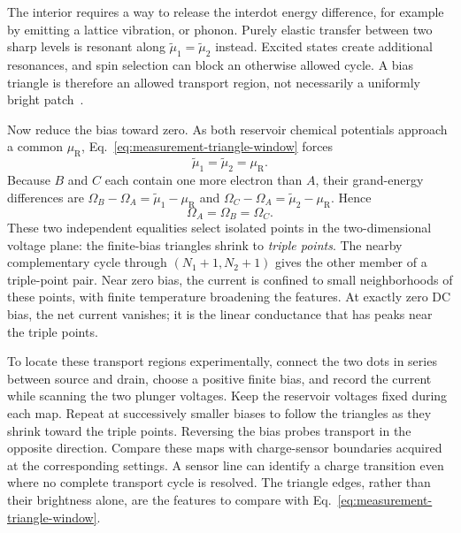 The interior requires a way to release the interdot energy
difference, for example by emitting a lattice vibration, or phonon.
Purely elastic transfer between two sharp levels is resonant along
$\widetilde\mu_1=\widetilde\mu_2$ instead. Excited states create
additional resonances, and spin selection can block an otherwise
allowed cycle. A bias triangle is therefore an allowed transport
region, not necessarily a uniformly bright patch~\cite{VanDerWiel2003}.

Now reduce the bias toward zero. As both reservoir chemical
potentials approach a common $\mu_{\mathrm R}$,
Eq.~\eqref{eq:measurement-triangle-window} forces
\[
 \widetilde\mu_1=\widetilde\mu_2=\mu_{\mathrm R}.
\]
Because $B$ and $C$ each contain one more electron than $A$,
their grand-energy differences are
$\Omega_B-\Omega_A=\widetilde\mu_1-\mu_{\mathrm R}$ and
$\Omega_C-\Omega_A=\widetilde\mu_2-\mu_{\mathrm R}$. Hence
\begin{equation}
 \Omega_A=\Omega_B=\Omega_C.
 \label{eq:measurement-triple-point}
\end{equation}
These two independent equalities select isolated points in the
two-dimensional voltage plane: the finite-bias triangles shrink
to \emph{triple points}. The nearby complementary cycle through
$(N_1+1,N_2+1)$ gives the other member of a triple-point pair.
Near zero bias, the current is confined to small neighborhoods
of these points, with finite temperature broadening the features.
At exactly zero DC bias, the net current vanishes; it is the
linear conductance that has peaks near the triple points.

To locate these transport regions experimentally, connect the two
dots in series between source and drain, choose a positive finite
bias, and record the current while scanning the two plunger
voltages. Keep the reservoir voltages fixed during each map.
Repeat at successively smaller biases to follow the triangles
as they shrink toward the triple points. Reversing the bias probes
transport in the opposite direction. Compare these maps with
charge-sensor boundaries acquired at the corresponding settings.
A sensor line can identify a charge transition even where no
complete transport cycle is resolved. The triangle edges, rather
than their brightness alone, are the features to compare with
Eq.~\eqref{eq:measurement-triangle-window}.
